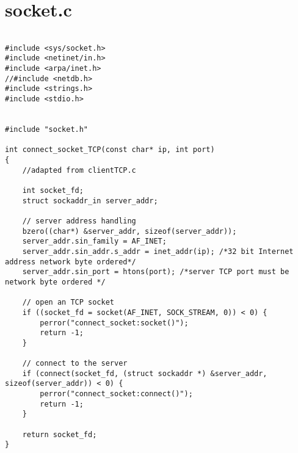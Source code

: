 \section{socket.c}
\label{SOCKETC}

\begin{lstlisting}

#include <sys/socket.h>
#include <netinet/in.h>
#include <arpa/inet.h>
//#include <netdb.h>
#include <strings.h>
#include <stdio.h>


#include "socket.h"

int connect_socket_TCP(const char* ip, int port)
{
	//adapted from clientTCP.c
	
	int socket_fd;
	struct sockaddr_in server_addr;

	// server address handling
	bzero((char*) &server_addr, sizeof(server_addr));
	server_addr.sin_family = AF_INET;
	server_addr.sin_addr.s_addr = inet_addr(ip); /*32 bit Internet address network byte ordered*/
	server_addr.sin_port = htons(port); /*server TCP port must be network byte ordered */

	// open an TCP socket
	if ((socket_fd = socket(AF_INET, SOCK_STREAM, 0)) < 0) {
		perror("connect_socket:socket()");
		return -1;
	}

	// connect to the server
	if (connect(socket_fd, (struct sockaddr *) &server_addr, sizeof(server_addr)) < 0) {
		perror("connect_socket:connect()");
		return -1;
	}

	return socket_fd;
}

\end{lstlisting}